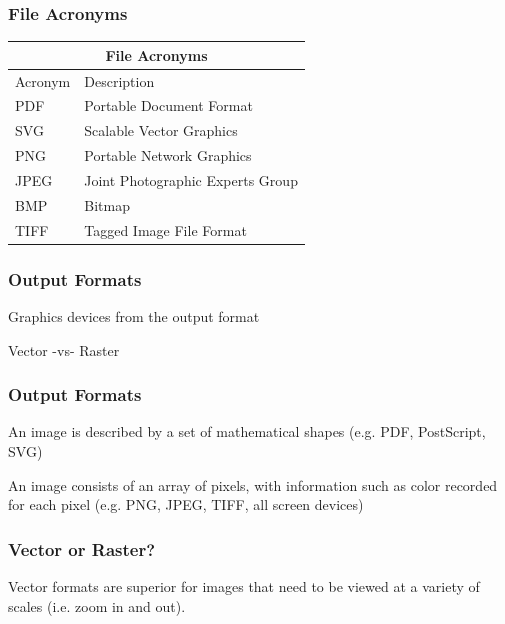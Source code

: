 \documentclass[12pt]{beamer}\usepackage[]{graphicx}\usepackage[]{color}
\begin{document}

\begin{frame}
\frametitle{File Acronyms}

\begin{center}
  \begin{tabular}{l l}
  \multicolumn{2}{c}{\textbf{File Acronyms}} \\
  \hline
  Acronym & Description \\
    \hline
    PDF & Portable Document Format \\
    SVG & Scalable Vector Graphics \\
    PNG & Portable Network Graphics \\
    JPEG & Joint Photographic Experts Group \\
    BMP & Bitmap \\
    TIFF & Tagged Image File Format \\
    \hline
 \end{tabular}
\end{center}

\end{frame}


\begin{frame}
\frametitle{Output Formats}

\centerline{\Large \mdlit Graphics devices from the output format}

\bigskip

\centerline{\Large Vector \quad -vs- \quad Raster}

\end{frame}


\begin{frame}
\frametitle{Output Formats}

An image is described by a set of mathematical shapes (e.g. PDF, PostScript, SVG)
\eb

An image consists of an array of pixels, with information such as color recorded for each pixel (e.g. PNG, JPEG, TIFF, all screen devices)
\eb

\end{frame}


\begin{frame}
\frametitle{Vector or Raster?}

Vector formats are superior for images that need to be viewed at a variety of scales (i.e. zoom in and out).
\eb

\end{frame}
\end{document}

